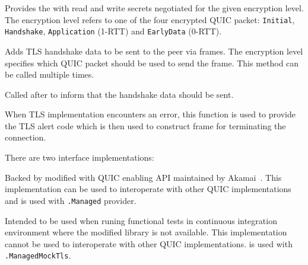 \begin{description}

   Provides the
\ManagedQuicConnection{} with read and write secrets negotiated for the given encryption level. The
encryption level refers to one of the four encrypted QUIC packet: \texttt{Initial},
\texttt{Handshake}, \texttt{Application} (1-RTT) and \texttt{EarlyData} (0-RTT).

   Adds TLS handshake data to be sent to the peer via \CRYPTO{} frames.
The encryption level specifies which QUIC packet should be used to send the \CRYPTO{} frame. This
method can be called multiple times.

   Called after  to
inform \ManagedQuicConnection{} that the handshake data should be sent.

   When
TLS implementation encounters an error, this function is used to provide the TLS alert code which is
then used to construct \CONNECTIONCLOSE{} frame for terminating the connection.

\end{description}

There are two \ITls{} interface implementations:

\begin{itemize}

  \litem[]{\OpenSslTls{}} Backed by modified \libopenssl{} with QUIC enabling API maintained by
Akamai~\cite{AkamaiOpensslGithub}. This implementation can be used to interoperate with other QUIC
implementations and is used with \texttt{\QuicImplementationProviders{}\allowbreak{}.Managed}
provider.

  \litem[]{\MockTls{}} Intended to be used when runing functional tests in continuous integration
environment where the modified \libopenssl{} library is not available. This implementation cannot be
used to interoperate with other QUIC implementations. \MockTls{} is used with
\texttt{\QuicImplementationProviders{}\allowbreak{}.ManagedMockTls}.

\end{itemize}


